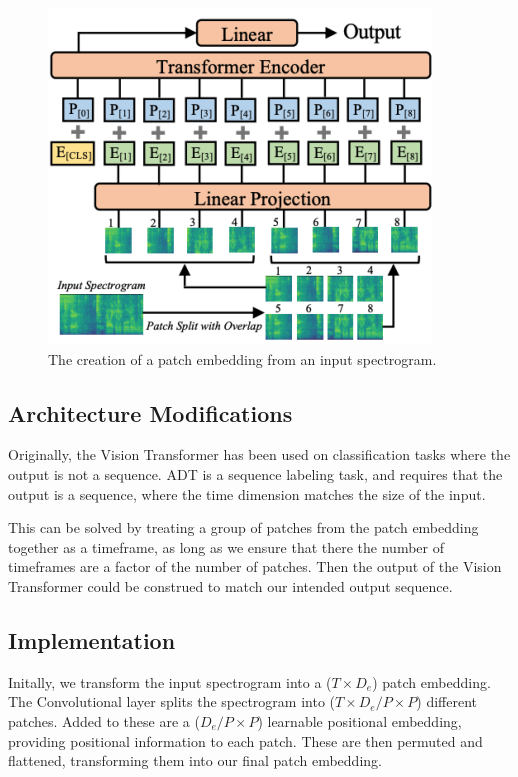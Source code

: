 \begin{figure}[H]
    \centering
    \includegraphics[trim=0 0 0 132, clip, scale=0.7]{figures/patchembedding.png}
    \caption{The creation of a patch embedding from an input spectrogram.}
    \label{PatchEmbeddingFigure}
\end{figure}

\subsection{Architecture Modifications}

Originally, the Vision Transformer has been used on classification tasks where the output is not a sequence. \gls{ADT} is a sequence labeling task, and requires that the output is a sequence, where the time dimension matches the size of the input.

This can be solved by treating a group of patches from the patch embedding together as a timeframe, as long as we ensure that there the number of timeframes are a factor of the number of patches. Then the output of the Vision Transformer could be construed to match our intended output sequence.

\subsection{Implementation}

Initally, we transform the input spectrogram into a ($T \times D_e$) patch embedding. The Convolutional layer splits the spectrogram into ($T \times D_e / P \times P$) different patches. Added to these are a ($D_e / P \times P$) learnable positional embedding, providing positional information to each patch. These are then permuted and flattened, transforming them into our final patch embedding.

